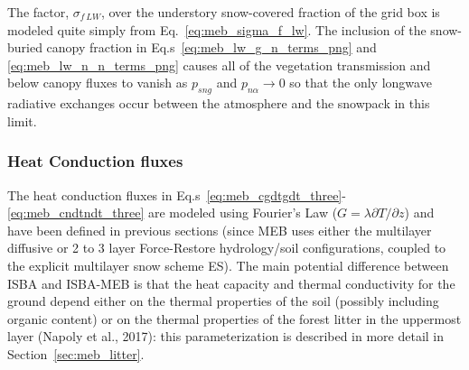 %
The factor, $\sigma_{f\,LW}$, over the understory snow-covered fraction of the grid
box is modeled quite simply from Eq.~\ref{eq:meb_sigma_f_lw}.
%
%
%
The inclusion of the snow-buried canopy fraction in
Eq.s~\ref{eq:meb_lw_g_n_terms_png} and \ref{eq:meb_lw_n_n_terms_png}
causes all of the vegetation transmission and below canopy fluxes to vanish as
$p_{sng}$ and $p_{n\alpha}\rightarrow 0$ so that the only longwave
radiative exchanges occur between the atmosphere and the snowpack in
this limit. 




\subsubsection{Heat Conduction fluxes}
\label{sec:meb_energy_budget_cond}

The heat
conduction fluxes in Eq.s~\ref{eq:meb_cgdtgdt_three}-\ref{eq:meb_cndtndt_three}
are modeled 
using Fourier's Law ($G=\lambda\partial T/\partial z$)
and have been defined in previous sections (since MEB uses
either the multilayer diffusive or 2 to 3 layer Force-Restore 
hydrology/soil configurations, coupled to the explicit multilayer snow
scheme ES).
%
The main potential difference between ISBA and ISBA-MEB is that
the heat capacity and thermal conductivity for the ground 
depend either on the thermal properties of the soil
(possibly including organic content)
or on the thermal
properties of the forest litter
in the uppermost layer (Napoly et al., 2017)\nocite{napoly_ea_2017}: 
this parameterization
is described in more detail in Section~\ref{sec:meb_litter}.

